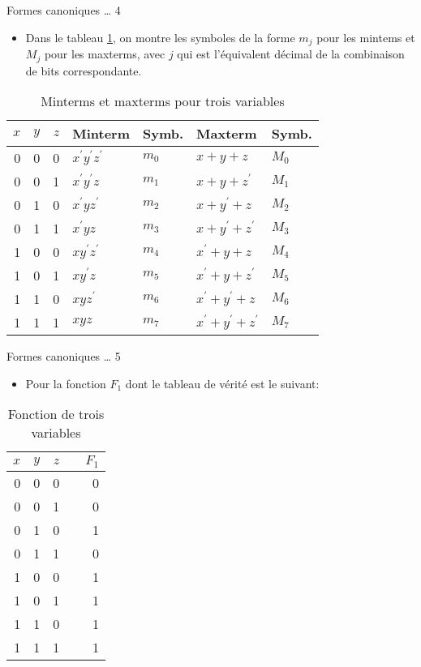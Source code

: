 \documentclass[presentation]{beamer}
\begin{document}
\begin{frame}[label={sec:org39a7ac3}]{Formes canoniques \ldots{} 4}
\begin{itemize}
\item Dans le tableau \ref{tab:org34d351f}, on montre les symboles de la forme \(m_j\) pour les mintems et \(M_j\) pour les maxterms, avec \(j\) qui est l'équivalent décimal de la combinaison de bits correspondante.
\end{itemize}

\begin{table}[htbp]
\caption{\label{tab:org34d351f}Minterms et maxterms pour trois variables}
\centering
\begin{tabular}{rrrllll}
\(x\) & \(y\) & \(z\) & Minterm & Symb. & Maxterm & Symb.\\
\hline
0 & 0 & 0 & \(x^\prime y^\prime z^\prime\) & \(m_0\) & \(x+ y+ z\) & \(M_0\)\\
0 & 0 & 1 & \(x^\prime y^\prime z\) & \(m_1\) & \(x+ y+ z^\prime\) & \(M_1\)\\
0 & 1 & 0 & \(x^\prime y z^\prime\) & \(m_2\) & \(x+ y^\prime+ z\) & \(M_2\)\\
0 & 1 & 1 & \(x^\prime y z\) & \(m_3\) & \(x+ y^\prime+ z^\prime\) & \(M_3\)\\
1 & 0 & 0 & \(x y^\prime z^\prime\) & \(m_4\) & \(x^\prime+ y+ z\) & \(M_4\)\\
1 & 0 & 1 & \(x y^\prime z\) & \(m_5\) & \(x^\prime+ y+ z^\prime\) & \(M_5\)\\
1 & 1 & 0 & \(x y z^\prime\) & \(m_6\) & \(x^\prime+ y^\prime+ z\) & \(M_6\)\\
1 & 1 & 1 & \(x y z\) & \(m_7\) & \(x^\prime + y^\prime+ z^\prime\) & \(M_7\)\\
\end{tabular}
\end{table}
\end{frame}

\begin{frame}[label={sec:orgdaebdc7}]{Formes canoniques \ldots{} 5}
\begin{itemize}
\item Pour la fonction \(F_1\) dont le tableau de vérité est le suivant:
\end{itemize}

\begin{table}[htbp]
\caption{\label{tab:org2cc1502}Fonction de trois variables}
\centering
\begin{tabular}{rrrlr}
\(x\) & \(y\) & \(z\) &  & \(F_1\)\\
\hline
0 & 0 & 0 &  & 0\\
0 & 0 & 1 &  & 0\\
0 & 1 & 0 &  & 1\\
0 & 1 & 1 &  & 0\\
1 & 0 & 0 &  & 1\\
1 & 0 & 1 &  & 1\\
1 & 1 & 0 &  & 1\\
1 & 1 & 1 &  & 1\\
\end{tabular}
\end{table}
\end{frame}
\end{document}
